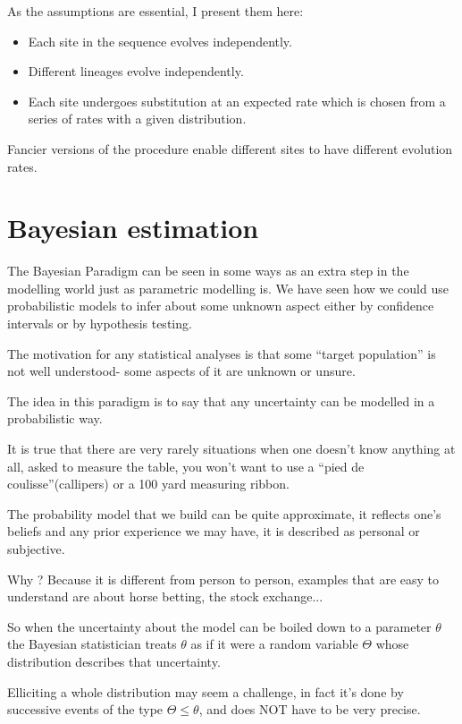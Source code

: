 As the assumptions are  essential,
I present them here:
\begin{itemize}
	\item Each site in the sequence evolves independently.
	\item Different lineages evolve independently.
	\item Each site undergoes substitution at an expected rate which  is  chosen from  a  series  of  rates with a given distribution.
\end{itemize}
Fancier versions of the procedure enable
different sites to have different
evolution rates.

\section{Bayesian estimation}

The Bayesian Paradigm can be seen in some
ways as an extra step in the modelling world just
as parametric modelling is. We have seen how we
could use probabilistic models to infer about 
some unknown aspect either by confidence intervals
or by hypothesis testing.

The motivation for any statistical analyses
is that some ``target population'' is not well understood- some
aspects of it are unknown or unsure.

The idea in this paradigm is to say
that any uncertainty can be modelled
in a probabilistic way.

It is true that there are very rarely situations when one doesn't
know anything at all, asked to measure the table,
you won't want to use a ``pied de coulisse''(callipers) or a 
100 yard measuring ribbon. 

The probability model that we build can be quite approximate,
it reflects one's beliefs and any prior experience
we may have, it is described as personal or subjective.

Why ? Because it is different from person to person, examples
that are easy to understand are about horse betting,
the stock exchange...

So when the uncertainty about the model can be boiled down
to a parameter $\theta$ the Bayesian statistician treats $\theta$ as if
it were a random variable $\Theta$ whose distribution describes that 
uncertainty.

Elliciting a whole distribution may seem a challenge,
in fact it's done by successive events of the type $\Theta \leq \theta$,
and does NOT have to be very precise.

